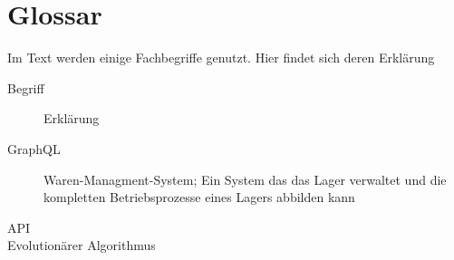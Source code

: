 \chapter{Glossar}

Im Text werden einige Fachbegriffe genutzt. Hier findet sich deren Erklärung

\begin{description}
    \item[Begriff] Erklärung
    \item[GraphQL] Waren-Managment-System; Ein System das das Lager verwaltet und die kompletten Betriebsprozesse eines Lagers abbilden kann
    \item[API]
    \item[Evolutionärer Algorithmus]
\end{description}

